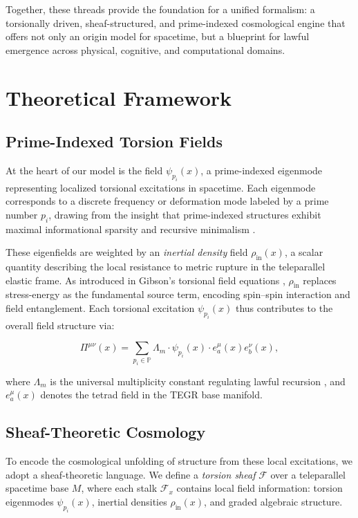 \documentclass{article}
\theoremstyle{plain}
\begin{document}
Together, these threads provide the foundation for a unified formalism: a torsionally driven, sheaf-structured, and prime-indexed cosmological engine that offers not only an origin model for spacetime, but a blueprint for lawful emergence across physical, cognitive, and computational domains.

\section{Theoretical Framework}

\subsection{Prime-Indexed Torsion Fields}

At the heart of our model is the field $\psi_{p_i}(x)$, a prime-indexed eigenmode representing localized torsional excitations in spacetime. Each eigenmode corresponds to a discrete frequency or deformation mode labeled by a prime number $p_i$, drawing from the insight that prime-indexed structures exhibit maximal informational sparsity and recursive minimalism \cite{vanGelder2025PIRTM,vanGelder2025Multiplicity}.

These eigenfields are weighted by an \emph{inertial density} field $\rho_{\text{in}}(x)$, a scalar quantity describing the local resistance to metric rupture in the teleparallel elastic frame. As introduced in Gibson’s torsional field equations \cite{gibson2025field}, $\rho_{\text{in}}$ replaces stress-energy as the fundamental source term, encoding spin–spin interaction and field entanglement. Each torsional excitation $\psi_{p_i}(x)$ thus contributes to the overall field structure via:

\[
\Pi^{\mu\nu}(x) = \sum_{p_i \in \mathbb{P}} \Lambda_m \cdot \psi_{p_i}(x) \cdot e^\mu_a(x) e^\nu_b(x),
\]

where $\Lambda_m$ is the universal multiplicity constant regulating lawful recursion \cite{vanGelder2025Multiplicity}, and $e^\mu_a(x)$ denotes the tetrad field in the TEGR base manifold.

\subsection{Sheaf-Theoretic Cosmology}

To encode the cosmological unfolding of structure from these local excitations, we adopt a sheaf-theoretic language. We define a \emph{torsion sheaf} $\mathcal{F}$ over a teleparallel spacetime base $M$, where each stalk $\mathcal{F}_x$ contains local field information: torsion eigenmodes $\psi_{p_i}(x)$, inertial densities $\rho_{\text{in}}(x)$, and graded algebraic structure.
\end{document}
